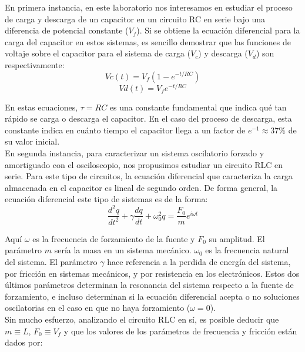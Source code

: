 \documentclass[%
 reprint,
 amsmath,amssymb,
 aps,
]{revtex4-1}
\begin{document}
En primera instancia, en este laboratorio nos interesamos en estudiar el proceso de carga y descarga de un capacitor en un circuito RC en serie bajo una diferencia de potencial constante ($V_f$). Si se obtiene la ecuación diferencial para la carga del capacitor en estos sistemas, es sencillo demostrar que las funciones de voltaje sobre el capacitor para el sistema de carga ($V_c$) y descarga ($V_d$) son respectivamente:\\

\begin{equation}
Vc(t) = V_f(1-e^{-t/{RC}})
\end{equation}
\begin{equation}
Vd(t) = V_fe^{-t/{RC}}
\end{equation}

En estas ecuaciones, $\tau = RC$ es una constante fundamental que indica qu\'e tan r\'apido se carga o descarga el capacitor. En el caso del proceso de descarga, esta constante indica en cu\'anto tiempo el capacitor llega a un factor de $e^{-1} \approx 37\% $ de su valor inicial. \\

En segunda instancia, para caracterizar un sistema oscilatorio forzado y amortiguado con el osciloscopio, nos propusimos estudiar un circuito RLC en serie. Para este tipo de circuitos, la ecuaci\'on diferencial que caracteriza la carga almacenada en el capacitor es lineal de segundo orden. De forma general, la ecuación diferencial este tipo de sistemas es de la forma:\\

\begin{equation}
\frac{d^2q}{dt^2} + \gamma\frac{dq}{dt} + \omega_0^2q = \frac{F_0}{m}e^{i\omega t}
\end{equation}

Aqu\'i $\omega$ es la frecuencia de forzamiento de la fuente y $F_0$ su amplitud. El par\'ametro $m$ ser\'ia la masa en un sistema mec\'anico. $\omega_0$ es la frecuencia natural del sistema. El par\'ametro $\gamma$ hace referencia a la perdida de energ\'ia del sistema, por fricci\'on en sistemas mec\'anicos, y por resistencia en los electr\'onicos. Estos dos \'ultimos par\'ametros determinan la resonancia del sistema respecto a la fuente de forzamiento, e incluso determinan si la ecuaci\'on diferencial acepta o no soluciones oscilatorias en el caso en que no haya forzamiento ($\omega = 0$).\\

Sin mucho esfuerzo, analizando el circuito RLC en s\'i, es posible deducir que $m \equiv L$, $F_0 \equiv V_f$ y que los valores de los par\'ametros de frecuencia y fricci\'on están dados por:\\
\end{document}
